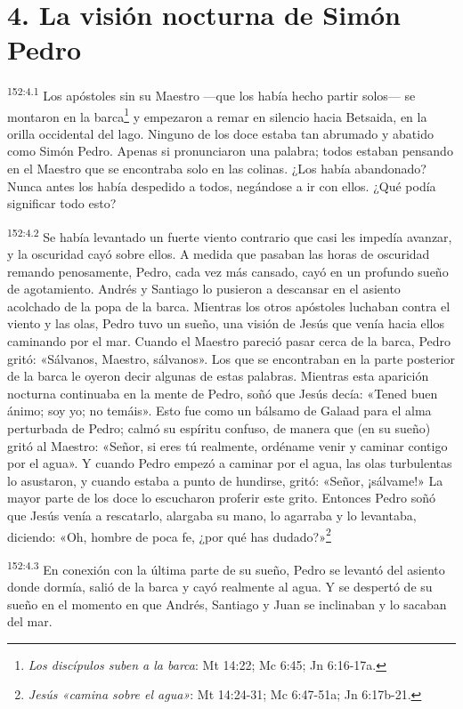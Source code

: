 \section*{4. La visión nocturna de Simón Pedro}
\par
\textsuperscript{152:4.1} Los apóstoles sin su Maestro ---que los había hecho partir solos--- se montaron en la barca\footnote{\textit{Los discípulos suben a la barca}: Mt 14:22; Mc 6:45; Jn 6:16-17a.} y empezaron a remar en silencio hacia Betsaida, en la orilla occidental del lago. Ninguno de los doce estaba tan abrumado y abatido como Simón Pedro. Apenas si pronunciaron una palabra; todos estaban pensando en el Maestro que se encontraba solo en las colinas. ¿Los había abandonado? Nunca antes los había despedido a todos, negándose a ir con ellos. ¿Qué podía significar todo esto?

\par
\textsuperscript{152:4.2} Se había levantado un fuerte viento contrario que casi les impedía avanzar, y la oscuridad cayó sobre ellos. A medida que pasaban las horas de oscuridad remando penosamente, Pedro, cada vez más cansado, cayó en un profundo sueño de agotamiento. Andrés y Santiago lo pusieron a descansar en el asiento acolchado de la popa de la barca. Mientras los otros apóstoles luchaban contra el viento y las olas, Pedro tuvo un sueño, una visión de Jesús que venía hacia ellos caminando por el mar. Cuando el Maestro pareció pasar cerca de la barca, Pedro gritó: «Sálvanos, Maestro, sálvanos». Los que se encontraban en la parte posterior de la barca le oyeron decir algunas de estas palabras. Mientras esta aparición nocturna continuaba en la mente de Pedro, soñó que Jesús decía: «Tened buen ánimo; soy yo; no temáis». Esto fue como un bálsamo de Galaad para el alma perturbada de Pedro; calmó su espíritu confuso, de manera que (en su sueño) gritó al Maestro: «Señor, si eres tú realmente, ordéname venir y caminar contigo por el agua». Y cuando Pedro empezó a caminar por el agua, las olas turbulentas lo asustaron, y cuando estaba a punto de hundirse, gritó: «Señor, ¡sálvame!» La mayor parte de los doce lo escucharon proferir este grito. Entonces Pedro soñó que Jesús venía a rescatarlo, alargaba su mano, lo agarraba y lo levantaba, diciendo: «Oh, hombre de poca fe, ¿por qué has dudado?»\footnote{\textit{Jesús «camina sobre el agua»}: Mt 14:24-31; Mc 6:47-51a; Jn 6:17b-21.}

\par
\textsuperscript{152:4.3} En conexión con la última parte de su sueño, Pedro se levantó del asiento donde dormía, salió de la barca y cayó realmente al agua. Y se despertó de su sueño en el momento en que Andrés, Santiago y Juan se inclinaban y lo sacaban del mar.


